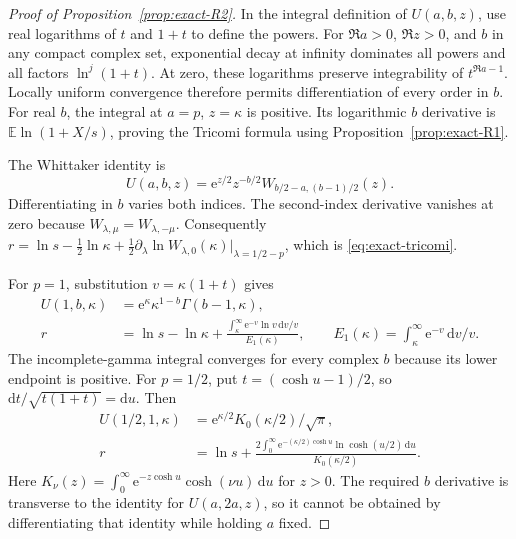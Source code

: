 \begin{proof}[Proof of Proposition~\ref{prop:exact-R2}]
In the integral definition of $U(a,b,z)$, use real logarithms of $t$ and $1+t$ to define the powers. For $\Re a>0$, $\Re z>0$, and $b$ in any compact complex set, exponential decay at infinity dominates all powers and all factors $\ln^j(1+t)$. At zero, these logarithms preserve integrability of $t^{\Re a-1}$. Locally uniform convergence therefore permits differentiation of every order in $b$. For real $b$, the integral at $a=p$, $z=\kappa$ is positive. Its logarithmic $b$ derivative is $\mathbb E\ln(1+X/s)$, proving the Tricomi formula using Proposition~\ref{prop:exact-R1}.

The Whittaker identity is
\begin{equation}
 U(a,b,z)=\mathrm{e}^{z/2}z^{-b/2}
 W_{b/2-a,(b-1)/2}(z).
 \label{eq:exact-whittaker-identity}
\end{equation}
Differentiating in $b$ varies both indices. The second-index derivative vanishes at zero because $W_{\lambda,\mu}=W_{\lambda,-\mu}$. Consequently $r=\ln s-\tfrac12\ln\kappa+\tfrac12\partial_\lambda\ln W_{\lambda,0}(\kappa)|_{\lambda=1/2-p}$, which is \eqref{eq:exact-tricomi}.

For $p=1$, substitution $v=\kappa(1+t)$ gives
\begin{equation}
 \begin{split}
 U(1,b,\kappa)&=\mathrm{e}^{\kappa}\kappa^{1-b}\Gamma(b-1,\kappa),\\
 r&=\ln s-\ln\kappa+
 \frac{\int_\kappa^\infty\mathrm{e}^{-v}\ln v\,\mathrm{d}v/v}{E_1(\kappa)},
 \qquad E_1(\kappa)=\int_\kappa^\infty\mathrm{e}^{-v}\,\mathrm{d}v/v.
 \end{split}\label{eq:exact-shape-one}
\end{equation}
The incomplete-gamma integral converges for every complex $b$ because its lower endpoint is positive. For $p=1/2$, put $t=(\cosh u-1)/2$, so $\mathrm{d}t/\sqrt{t(1+t)}=\mathrm{d}u$. Then
\begin{equation}
 \begin{split}
 U(1/2,1,\kappa)&=\mathrm{e}^{\kappa/2}K_0(\kappa/2)/\sqrt\pi,\\
 r&=\ln s+
 \frac{2\int_0^\infty\mathrm{e}^{-(\kappa/2)\cosh u}\ln\cosh(u/2)\,\mathrm{d}u}{K_0(\kappa/2)}.
 \end{split}\label{eq:exact-shape-half}
\end{equation}
Here $K_\nu(z)=\int_0^\infty\mathrm{e}^{-z\cosh u}\cosh(\nu u)\,\mathrm{d}u$ for $z>0$. The required $b$ derivative is transverse to the identity for $U(a,2a,z)$, so it cannot be obtained by differentiating that identity while holding $a$ fixed.


\end{proof}
